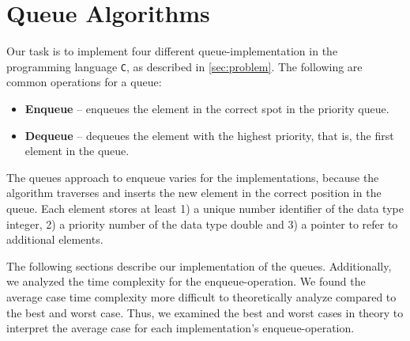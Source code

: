 \documentclass[a4paper,11pt]{kth-mag}
\newcommand*{\skippara}{\par\vspace{\baselineskip} \noindent}
\begin{document}
\section{Queue Algorithms}\label{sec:algorithms}
Our task is to implement four different queue-implementation in the programming language \texttt{C}, as described in \cref{sec:problem}.
The following are common operations for a queue:
\begin{itemize}
    \item \textbf{Enqueue} -- enqueues the element in the correct spot in the priority queue.
    \item \textbf{Dequeue} -- dequeues the element with the highest priority, that is, the first element in the queue.
\end{itemize}

\skippara The queues approach to enqueue varies for the implementations, because the algorithm traverses and inserts the new element in the correct position in the queue.
Each element stores at least 1) a unique number identifier of the data type integer, 2) a priority number of the data type double and 3) a pointer to refer to additional elements.

\skippara The following sections describe our implementation of the queues.
Additionally, we analyzed the time complexity for the enqueue-operation.
We found the average case time complexity more difficult to theoretically analyze compared to the best and worst case.
Thus, we examined the best and worst cases in theory to interpret the average case for each implementation's enqueue-operation.
\end{document}
